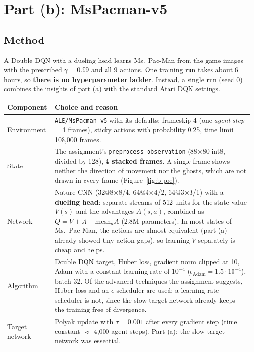 \section{Part (b): MsPacman-v5}
\label{sec:mspacman}

\subsection{Method}

A Double DQN with a dueling head learns Ms.\ Pac-Man from the game images with the prescribed $\gamma = 0.99$ and all 9 actions. One training run takes about 6 hours, so \textbf{there is no hyperparameter ladder}. Instead, a single run (seed 0) combines the insights of part (a) with the standard Atari DQN settings.

\begin{center}
\small
\begin{tabularx}{\textwidth}{@{}p{3.1cm}L@{}}
  \toprule
  \textbf{Component} & \textbf{Choice and reason} \\
  \midrule
  Environment & \texttt{ALE/MsPacman-v5} with its defaults: frameskip 4 (one \emph{agent step} = 4 frames), sticky actions with probability 0.25, time limit 108,000 frames. \\
  State & The assignment's \texttt{preprocess\_observation} (88$\times$80 int8, divided by 128), \textbf{4 stacked frames}. A single frame shows neither the direction of movement nor the ghosts, which are not drawn in every frame (Figure~\ref{fig:b-pre}). \\
  Network & Nature CNN (32@8$\times$8/4, 64@4$\times$4/2, 64@3$\times$3/1) with a \textbf{dueling head}: separate streams of 512 units for the state value $V(s)$ and the advantages $A(s, a)$, combined as $Q = V + A - \text{mean}_a A$ (2.8M parameters). In most states of Ms.\ Pac-Man, the actions are almost equivalent (part (a) already showed tiny action gaps), so learning $V$ separately is cheap and helps. \\
  Algorithm & Double DQN target, Huber loss, gradient norm clipped at 10, Adam with a constant learning rate of $10^{-4}$ ($\epsilon_{\text{Adam}} = 1.5 \cdot 10^{-4}$), batch 32. Of the advanced techniques the assignment suggests, Huber loss and an $\epsilon$ scheduler are used; a learning-rate scheduler is not, since the slow target network already keeps the training free of divergence. \\
  Target network & Polyak update with $\tau = 0.001$ after every gradient step (time constant $\approx$ 4,000 agent steps). Part (a): the slow target network was essential. \\

\end{tabularx}
\end{center}
